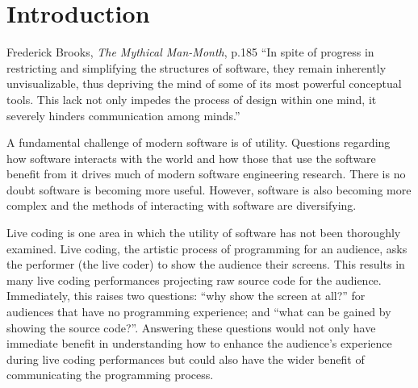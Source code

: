 
\chapter{Introduction}
\label{chap:introduction}

\begin{chapquote}{Frederick Brooks, \textit{The Mythical Man-Month}, p.185}
``In spite of progress in restricting and simplifying the structures of software, they remain inherently unvisualizable, thus depriving the mind of some of its most powerful conceptual tools. This lack not only impedes the process of design within one mind, it severely hinders communication among minds.''
\end{chapquote}


A fundamental challenge of modern software is of utility. Questions regarding how software interacts with the world and how those that use the software benefit from it drives much of modern software engineering research. There is no doubt software is becoming more useful. However, software is also becoming more complex and the methods of interacting with software are diversifying.

Live coding is one area in which the utility of software has not been thoroughly examined. Live coding, the artistic process of programming for an audience, asks the performer (the live coder) to show the audience their screens. This results in many live coding performances projecting raw source code for the audience. Immediately, this raises two questions: ``why show the screen at all?'' for audiences that have no programming experience; and ``what can be gained by showing the source code?''. Answering these questions would not only have immediate benefit in understanding how to enhance the audience's experience during live coding performances but could also have the wider benefit of communicating the programming process.







